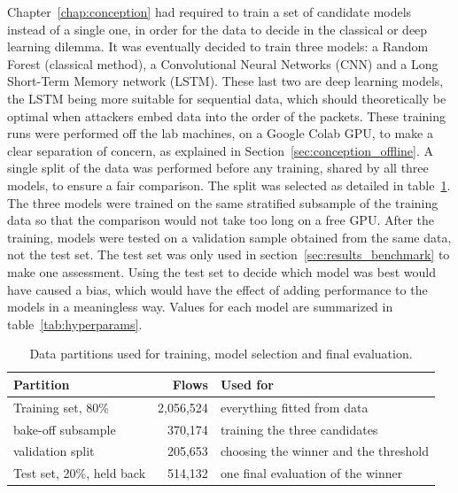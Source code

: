 Chapter~\ref{chap:conception} had required to train a set of candidate models instead of a single one, in order for the data to decide in the classical or deep learning dilemma. It was eventually decided to train three models: a Random Forest (classical method), a Convolutional Neural Networks (CNN) and a Long Short-Term Memory network (LSTM). These last two are deep learning models, the LSTM being more suitable for sequential data, which should theoretically be optimal when attackers embed data into the order of the packets. These training runs were performed off the lab machines, on a Google Colab GPU, to make a clear separation of concern, as explained in Section~\ref{sec:conception_offline}.
A single split of the data was performed before any training, shared by all three models, to ensure a fair comparison. The split was selected as detailed in table~\ref{tab:protocol}. The three models were trained on the same stratified subsample of the training data so that the comparison would not take too long on a free GPU.
After the training, models were tested on a validation sample obtained from the same data, not the test set.
The test set was only used in section~\ref{sec:results_benchmark} to make one assessment. Using the test set to decide which model was best would have caused a bias, which would have the effect of adding performance to the models in a meaningless way. Values for each model are summarized in table~\ref{tab:hyperparams}.

\begin{table}[H]
  \centering
  \caption{Data partitions used for training, model selection and final evaluation.}
  \label{tab:protocol}
  \renewcommand{\arraystretch}{1.3}
  \begin{tabularx}{\textwidth}{Xrl}
    \toprule
    \textbf{Partition} & \textbf{Flows} & \textbf{Used for} \\
    \midrule
    Training set, 80\%              & 2,056,524 & everything fitted from data \\
    \quad bake-off subsample        & 370,174   & training the three candidates \\
    \quad validation split          & 205,653   & choosing the winner and the threshold \\
    Test set, 20\%, held back       & 514,132   & one final evaluation of the winner \\
    \bottomrule
  \end{tabularx}
\end{table}

